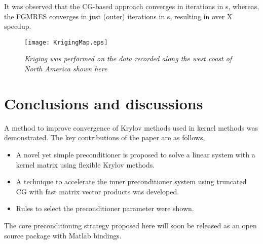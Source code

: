 \documentclass[10pt,journal,letterpaper,compsoc]{IEEEtran}
\begin{document}
It was observed that the CG-based approach converges in  iterations in s, whereas, the FGMRES converges in just  (outer) iterations in s, resulting in over X speedup.

\begin{figure}[bth]
\centering
\texttt{[image: KrigingMap.eps]}
\caption{\emph{Kriging was performed on the data recorded along the west coast of North America shown here}\label{fig:KrigingMap}}
\end{figure}

\section{Conclusions and discussions\label{sec:conclusions}}
A method to improve convergence of Krylov methods used in kernel methods was demonstrated. The key contributions of the paper are as follows,
\begin{itemize}
\item A novel yet simple preconditioner is proposed to solve a linear system with a kernel matrix using flexible Krylov methods.
\item A technique to accelerate the inner preconditioner system using truncated CG with fast matrix vector products was developed.
\item Rules to select the preconditioner parameter were shown.
\end{itemize}
The core preconditioning strategy proposed here will soon be released as an open source package with Matlab bindings.
\end{document}
